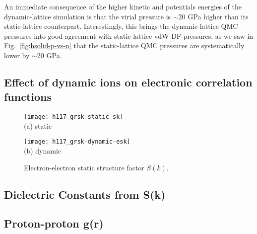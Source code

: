 An immediate consequence of the higher kinetic and potentials energies of the dynamic-lattice simulation is that the virial pressure is $\sim 20$ GPa higher than its static-lattice counterpart.
Interestingly, this brings the dynamic-lattice QMC pressures into good agreement with static-lattice vdW-DF pressures, as we saw in Fig.~\ref{fig:hsolid-p-vs-n} that the static-lattice QMC pressures are systematically lower by $\sim 20$ GPa.

\subsection{Effect of dynamic ions on electronic correlation functions}

\begin{figure}[h]
\centering
\begin{minipage}{0.49\textwidth}
\centering
\texttt{[image: h117\_grsk-static-sk]}\\
(a) static
\end{minipage}
\begin{minipage}{0.49\textwidth}
\centering
\texttt{[image: h117\_grsk-dynamic-esk]}\\
(b) dynamic
\end{minipage}
\caption{Electron-electron static structure factor $S(k)$.}
\label{fig:hsolid-esk}
\end{figure}

\subsection{Dielectric Constants from S(k)}

\subsection{Proton-proton g(r)}


